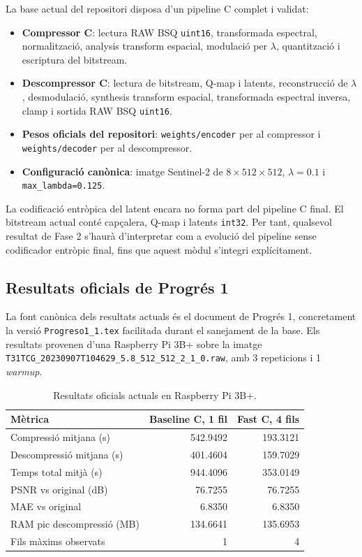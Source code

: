 \documentclass[11pt,a4paper]{article}
\begin{document}
La base actual del repositori disposa d'un pipeline C complet i validat:
\begin{itemize}
  \item \textbf{Compressor C}: lectura RAW BSQ \texttt{uint16}, transformada espectral, normalització, analysis transform espacial, modulació per $\lambda$, quantització i escriptura del bitstream.
  \item \textbf{Descompressor C}: lectura de bitstream, Q-map i latents, reconstrucció de $\lambda$, desmodulació, synthesis transform espacial, transformada espectral inversa, clamp i sortida RAW BSQ \texttt{uint16}.
  \item \textbf{Pesos oficials del repositori}: \texttt{weights/encoder} per al compressor i \texttt{weights/decoder} per al descompressor.
  \item \textbf{Configuració canònica}: imatge Sentinel-2 de $8 \times 512 \times 512$, $\lambda=0.1$ i \texttt{max\_lambda=0.125}.
\end{itemize}

La codificació entròpica del latent encara no forma part del pipeline C final. El bitstream actual conté capçalera, Q-map i latents \texttt{int32}. Per tant, qualsevol resultat de Fase 2 s'haurà d'interpretar com a evolució del pipeline sense codificador entròpic final, fins que aquest mòdul s'integri explícitament.

\subsection{Resultats oficials de Progrés 1}

La font canònica dels resultats actuals és el document de Progrés 1, concretament la versió \texttt{Progreso1\_1.tex} facilitada durant el sanejament de la base. Els resultats provenen d'una Raspberry Pi 3B+ sobre la imatge \texttt{T31TCG\_20230907T104629\_5.8\_512\_512\_2\_1\_0.raw}, amb 3 repeticions i 1 \textit{warmup}.

\begin{table}[H]
\centering
\begin{tabular}{lrr}
\toprule
\textbf{Mètrica} & \textbf{Baseline C, 1 fil} & \textbf{Fast C, 4 fils} \\
\midrule
Compressió mitjana (s) & 542.9492 & 193.3121 \\
Descompressió mitjana (s) & 401.4604 & 159.7029 \\
Temps total mitjà (s) & 944.4096 & 353.0149 \\
PSNR vs original (dB) & 76.7255 & 76.7255 \\
MAE vs original & 6.8350 & 6.8350 \\
RAM pic descompressió (MB) & 134.6641 & 135.6953 \\
Fils màxims observats & 1 & 4 \\
\bottomrule
\end{tabular}
\caption{Resultats oficials actuals en Raspberry Pi 3B+.}
\end{table}
\end{document}
